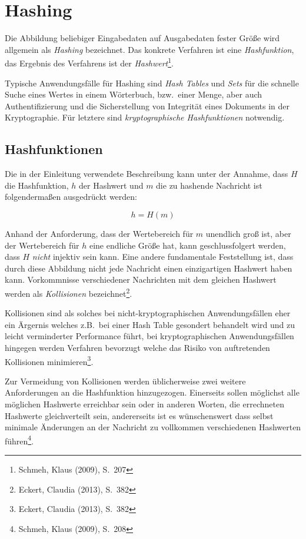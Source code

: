 \author{Autor: Vasilij Schneidermann}
\chapter{Hashing}

Die Abbildung beliebiger Eingabedaten auf Ausgabedaten fester Größe
wird allgemein als \emph{Hashing} bezeichnet.  Das konkrete Verfahren
ist eine \emph{Hashfunktion}, das Ergebnis des Verfahrens ist der
\emph{Hashwert}\footnote{Schmeh, Klaus (2009), S.~207}.

Typische Anwendungsfälle für Hashing sind \emph{Hash Tables} und
\emph{Sets} für die schnelle Suche eines Wertes in einem Wörterbuch,
bzw.~einer Menge, aber auch Authentifizierung und die Sicherstellung
von Integrität eines Dokuments in der Kryptographie.  Für letztere
sind \emph{kryptographische Hashfunktionen} notwendig.

\section{Hashfunktionen}

Die in der Einleitung verwendete Beschreibung kann unter der Annahme,
dass $H$ die Hashfunktion, $h$ der Hashwert und $m$ die zu hashende
Nachricht ist folgendermaßen ausgedrückt werden:

$$h = H(m)$$

Anhand der Anforderung, dass der Wertebereich für $m$ unendlich groß
ist, aber der Wertebereich für $h$ eine endliche Größe hat, kann
geschlussfolgert werden, dass $H$ \emph{nicht} injektiv sein kann.
Eine andere fundamentale Feststellung ist, dass durch diese Abbildung
nicht jede Nachricht einen einzigartigen Hashwert haben kann.
Vorkommnisse verschiedener Nachrichten mit dem gleichen Hashwert
werden als \emph{Kollisionen} bezeichnet\footnote{Eckert, Claudia
  (2013), S.~382}.

Kollisionen sind als solches bei nicht-kryptographischen
Anwendungsfällen eher ein Ärgernis welches z.B.~bei einer Hash Table
gesondert behandelt wird und zu leicht verminderter Performance führt,
bei kryptographischen Anwendungsfällen hingegen werden Verfahren
bevorzugt welche das Risiko von auftretenden Kollisionen
minimieren\footnote{Eckert, Claudia (2013), S.~382}.

Zur Vermeidung von Kollisionen werden üblicherweise zwei weitere
Anforderungen an die Hashfunktion hinzugezogen.  Einerseits sollen
möglichst alle möglichen Hashwerte erreichbar sein oder in anderen
Worten, die errechneten Hashwerte gleichverteilt sein, andererseits
ist es wünschenswert dass selbst minimale Änderungen an der Nachricht
zu vollkommen verschiedenen Hashwerten führen\footnote{Schmeh, Klaus
  (2009), S.~208}.

